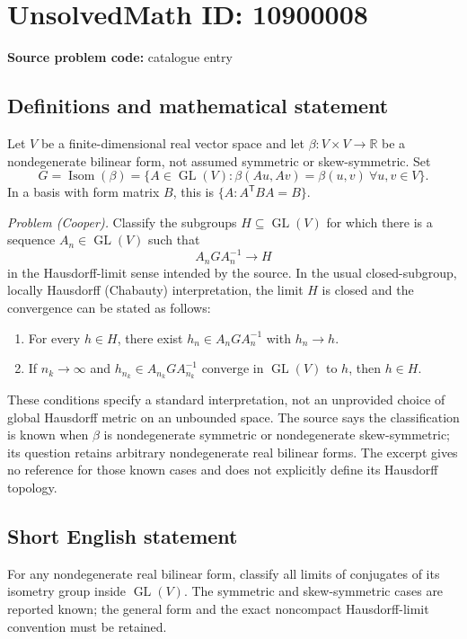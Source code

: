 \documentclass[11pt]{article}
\newcommand{\R}{\mathbb{R}}
\begin{document}
\section*{UnsolvedMath ID: 10900008}
\textbf{Source problem code:} catalogue entry
\subsection{Definitions and mathematical statement}
Let \(V\) be a finite-dimensional real vector space and let \(\beta:V\times V\to\R\) be a nondegenerate bilinear form, not assumed symmetric or skew-symmetric. Set
\[
 G=\operatorname{Isom}(\beta)
 =\{A\in\operatorname{GL}(V):\beta(Au,Av)=\beta(u,v)\ \forall u,v\in V\}.
\]
In a basis with form matrix \(B\), this is \(\{A:A^{\mathsf T}BA=B\}\).

\emph{Problem (Cooper).} Classify the subgroups \(H\subseteq\operatorname{GL}(V)\) for which there is a sequence \(A_n\in\operatorname{GL}(V)\) such that
\[
 A_nGA_n^{-1}\longrightarrow H
\]
in the Hausdorff-limit sense intended by the source. In the usual closed-subgroup, locally Hausdorff (Chabauty) interpretation, the limit \(H\) is closed and the convergence can be stated as follows:
\begin{enumerate}
\item For every \(h\in H\), there exist \(h_n\in A_nGA_n^{-1}\) with \(h_n\to h\).
\item If \(n_k\to\infty\) and \(h_{n_k}\in A_{n_k}GA_{n_k}^{-1}\) converge in \(\operatorname{GL}(V)\) to \(h\), then \(h\in H\).
\end{enumerate}
These conditions specify a standard interpretation, not an unprovided choice of global Hausdorff metric on an unbounded space. The source says the classification is known when \(\beta\) is nondegenerate symmetric or nondegenerate skew-symmetric; its question retains arbitrary nondegenerate real bilinear forms. The excerpt gives no reference for those known cases and does not explicitly define its Hausdorff topology.
\subsection{Short English statement}
For any nondegenerate real bilinear form, classify all limits of conjugates of its isometry group inside \(\operatorname{GL}(V)\). The symmetric and skew-symmetric cases are reported known; the general form and the exact noncompact Hausdorff-limit convention must be retained.
\end{document}

